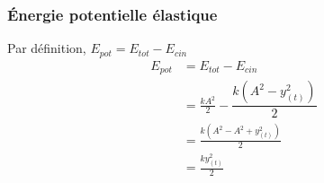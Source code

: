 \documentclass[11pt]{article}
\begin{document}
\subsubsection{Énergie potentielle élastique}
Par définition, $E_{pot} = E_{tot}-E_{cin}$ \\
\begin{equation}
    \begin{split}
        E_{pot} & = E_{tot}-E_{cin} \\
        & = \frac{kA^2}{2} - \dfrac{k(A^2-y_{(t)}^2)}{2} \\
        & = \frac{k(A^2-A^2+y_{(t)}^2)}{2} \\
        & = \frac{ky_{(t)}^2}{2}
    \end{split}
\end{equation}
\end{document}
